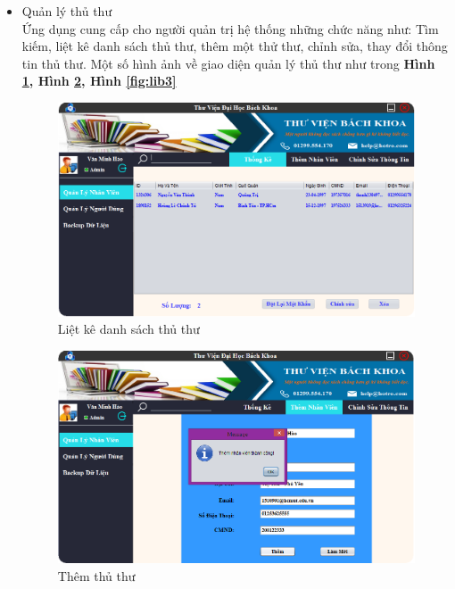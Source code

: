 \documentclass[12pt]{report}
\begin{document}
				\begin{itemize}
					\item Quản lý thủ thư\\
					Ứng dụng cung cấp cho người quản trị hệ thống những chức năng như: Tìm kiếm, liệt kê danh sách thủ thư, thêm một thử thư, chỉnh sửa, thay đổi thông tin thủ thư. Một số hình ảnh về giao diện quản lý thủ thư như trong \textbf{Hình \ref{fig:lib1}, Hình \ref{fig:lib2}, Hình \ref{fig:lib3}}
					\begin{figure}
						\centering
						\includegraphics[scale=0.65]{images/lib1.png}
						\caption{Liệt kê danh sách thủ thư}
						\label{fig:lib1}
						\end{figure}
						
						\begin{figure}
						\centering
						\includegraphics[scale=0.65]{images/lib2.png}
						\caption{Thêm thủ thư}
						\label{fig:lib2}
						\end{figure}
						

\end{itemize}
\end{document}
